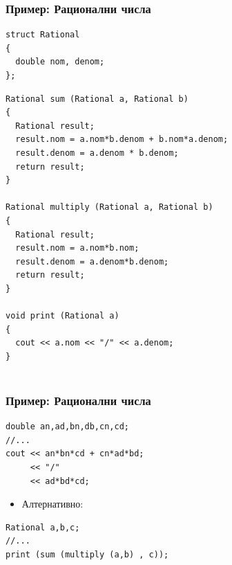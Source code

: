 \documentclass{beamer}
\begin{document}
\begin{frame}[fragile]
\frametitle{Пример: Рационални числа}

\begin{lstlisting}
struct Rational
{
  double nom, denom;
};
\end{lstlisting}

\begin{lstlisting}
Rational sum (Rational a, Rational b)
{
  Rational result;
  result.nom = a.nom*b.denom + b.nom*a.denom;
  result.denom = a.denom * b.denom;
  return result;
}

Rational multiply (Rational a, Rational b)
{
  Rational result;
  result.nom = a.nom*b.nom;
  result.denom = a.denom*b.denom;
  return result;
}

void print (Rational a)
{
  cout << a.nom << "/" << a.denom;
}


\end{lstlisting}

\end{frame}


\begin{frame}[fragile]
\frametitle{Пример: Рационални числа}


\begin{lstlisting}
double an,ad,bn,db,cn,cd;
//...
cout << an*bn*cd + cn*ad*bd;
     << "/"
     << ad*bd*cd;
\end{lstlisting}

\begin{itemize}
  \item Алтернативно:
\end{itemize}


\begin{lstlisting}
Rational a,b,c;
//...
print (sum (multiply (a,b) , c));
\end{lstlisting}

\end{frame}
\end{document}
